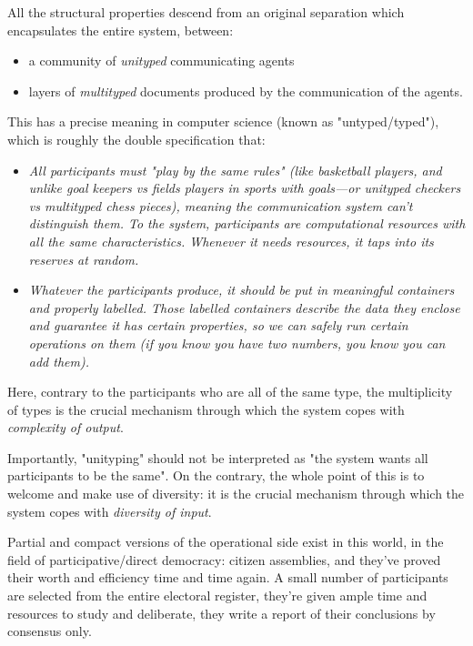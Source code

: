 \documentclass[11pt]{article}
\begin{document}
All the structural properties descend from an original separation which encapsulates the entire system, between:

\begin{itemize}

\item a community of \emph{unityped} communicating agents

\item layers of \emph{multityped} documents produced by the communication of the agents.

\end{itemize}

This has a precise meaning in computer science (known as "untyped/typed"), which is roughly the double specification that:

\begin{itemize}

\item \emph{All participants must "play by the same rules" (like basketball players, and unlike goal keepers vs fields players in sports with goals---or unityped checkers vs multityped chess pieces), meaning the communication system can't distinguish them. To the system, participants are computational resources with all the same characteristics. Whenever it needs resources, it taps into its reserves at random.}

\item \emph{Whatever the participants produce, it should be put in meaningful containers and properly labelled. Those labelled containers describe the data they enclose and guarantee it has certain properties, so we can safely run certain operations on them (if you know you have two numbers, you know you can add them).}

\end{itemize}

Here, contrary to the participants who are all of the same type, the multiplicity of types is the crucial mechanism through which the system copes with \emph{complexity of output}.

Importantly, "unityping" should not be interpreted as "the system wants all participants to be the same". On the contrary, the whole point of this is to welcome and make use of diversity: it is the crucial mechanism through which the system copes with \emph{diversity of input}.

Partial and compact versions of the operational side exist in this world, in the field of participative/direct democracy: citizen assemblies, and they've proved their worth and efficiency time and time again. A small number of participants are selected from the entire electoral register, they're given ample time and resources to study and deliberate, they write a report of their conclusions by consensus only.
\end{document}
